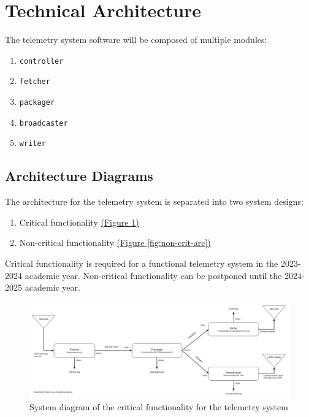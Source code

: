 \section{Technical Architecture}

The  telemetry system software will be composed of multiple modules:

\begin{enumerate}
    \setlength{\itemsep}{1pt}
    \setlength{\parskip}{0pt} \setlength{\parsep}{0pt}
    \item \texttt{controller}
    \item \texttt{fetcher}
    \item \texttt{packager}
    \item \texttt{broadcaster}
    \item \texttt{writer}
\end{enumerate}

\subsection{Architecture Diagrams}

The architecture for the  telemetry system is separated into two system designs:
\begin{enumerate}
    \setlength{\itemsep}{1pt}
    \setlength{\parskip}{0pt} \setlength{\parsep}{0pt}
    \item Critical functionality \hyperref[fig:crit-arc]{(Figure \ref{fig:crit-arc})}
    \item Non-critical functionality \hyperref[fig:non-crit-arc]{(Figure \ref{fig:non-crit-arc})}
\end{enumerate}

Critical functionality is required for a functional telemetry system in the 2023-2024 academic year. Non-critical
functionality can be postponed until the 2024-2025 academic year.

\begin{figure}[H]
    \includegraphics[width=\linewidth]{assets/critical-architecture.png}
    \caption{System diagram of the critical functionality for the telemetry system}
    \label{fig:crit-arc}
\end{figure}

